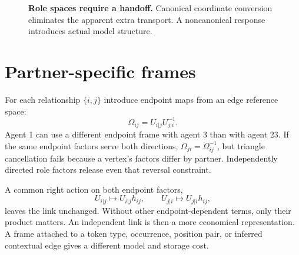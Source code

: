 \documentclass[11pt,letterpaper]{article}
\theoremstyle{remark}
\begin{document}
\begin{figure}[tb]
\centering
{}
\caption{\textbf{Role spaces require a handoff.} Canonical coordinate conversion eliminates the apparent extra transport. A noncanonical response introduces actual model structure.}
\end{figure}

\section{Partner-specific frames}
For each relationship $\{i,j\}$ introduce endpoint maps from an edge reference space:
\begin{equation}
 \Omega_{ij}=U_{i|j}U_{j|i}^{-1}.
 \label{eq:partner}
\end{equation}
Agent 1 can use a different endpoint frame with agent 3 than with agent 23. If the same endpoint factors serve both directions, $\Omega_{ji}=\Omega_{ij}^{-1}$, but triangle cancellation fails because a vertex's factors differ by partner. Independently directed role factors release even that reversal constraint.

A common right action on both endpoint factors,
\begin{equation}
 U_{i|j}\mapsto U_{i|j}h_{ij},\qquad U_{j|i}\mapsto U_{j|i}h_{ij},
\end{equation}
leaves the link unchanged. Without other endpoint-dependent terms, only their product matters. An independent link is then a more economical representation. A frame attached to a token type, occurrence, position pair, or inferred contextual edge gives a different model and storage cost.
\end{document}

